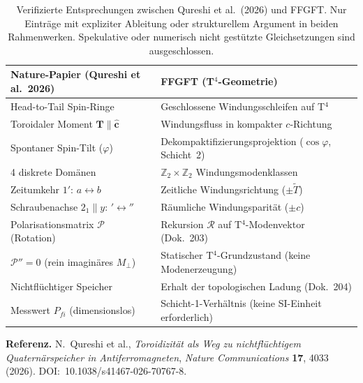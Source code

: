 \begin{table}[htbp]
\centering
\caption{Verifizierte Entsprechungen zwischen Qureshi et al.\ (2026) und FFGFT.
Nur Einträge mit expliziter Ableitung oder strukturellem Argument in beiden
Rahmenwerken. Spekulative oder numerisch nicht gestützte Gleichsetzungen
sind ausgeschlossen.}
\label{tab:korrespondenz}
\begin{tabular}{ll}
\toprule
\textbf{Nature-Papier (Qureshi et al.\ 2026)} & \textbf{FFGFT (T$^4$-Geometrie)} \\
\midrule
Head-to-Tail Spin-Ringe & Geschlossene Windungsschleifen auf T$^4$ \\
Toroidaler Moment $\mathbf{T}\parallel\hat{\mathbf{c}}$ &
  Windungsfluss in kompakter $c$-Richtung \\
Spontaner Spin-Tilt ($\varphi$) &
  Dekompaktifizierungsprojektion ($\cos\varphi$, Schicht~2) \\
4 diskrete Domänen &
  $\mathbb{Z}_2\times\mathbb{Z}_2$ Windungsmodenklassen \\
Zeitumkehr $1'$: $a\leftrightarrow b$ &
  Zeitliche Windungsrichtung ($\pm\tilde{T}$) \\
Schraubenachse $2_1\|y$: $'\leftrightarrow''$ &
  Räumliche Windungsparität ($\pm c$) \\
Polarisationsmatrix $\mathcal{P}$ (Rotation) &
  Rekursion $\mathcal{R}$ auf T$^4$-Modenvektor (Dok.~203) \\
$\mathcal{P}''=0$ (rein imaginäres $M_\perp$) &
  Statischer T$^4$-Grundzustand (keine Modenerzeugung) \\
Nichtflüchtiger Speicher &
  Erhalt der topologischen Ladung (Dok.~204) \\
Messwert $P_{fi}$ (dimensionslos) &
  Schicht-1-Verhältnis (keine SI-Einheit erforderlich) \\
\bottomrule
\end{tabular}
\end{table}

\noindent\textbf{Referenz.} N.~Qureshi et al., \textit{Toroidizität als Weg
zu nichtflüchtigem Quaternärspeicher in Antiferromagneten},
\textit{Nature Communications} \textbf{17}, 4033 (2026).
DOI:~10.1038/s41467-026-70767-8.
